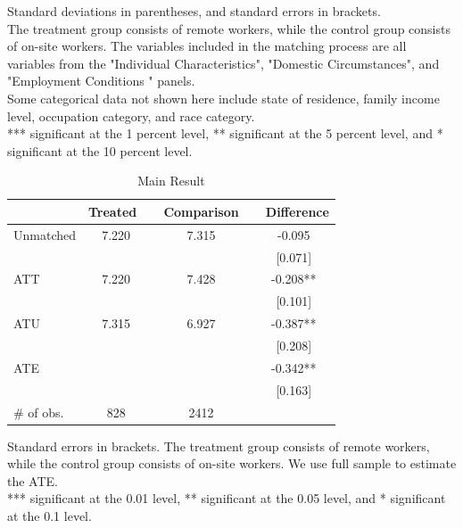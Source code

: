 \documentclass[12pt]{article}
\renewcommand{\arraystretch}{1.0} %
\begin{document}
\vspace{-2em}
\begin{singlespace}
        \begin{footnotesize}
        		 Standard deviations in parentheses, and standard errors in brackets.\\
          The treatment group consists of remote workers, while the control group consists of on-site workers. The variables included in the matching process are all variables from the "Individual Characteristics", "Domestic Circumstances", and "Employment Conditions " panels.\\
          Some categorical data not shown here include state of residence, family income level, occupation category, and race category. \\
		*** significant at the 1 percent level, ** significant at the 5 percent level, and * significant at the 10 percent level.
        \end{footnotesize}
\end{singlespace}


\newpage


\begin{table}[htbp]
\renewcommand{\arraystretch}{0.85}
\setlength{\tabcolsep}{2mm}
  \centering
  \caption{Main Result}
  \label{main_table}
{\small
    \begin{tabular}{lccc}
    \toprule
    & Treated~ & ~Comparison~ & ~Difference \\ 
    \midrule \midrule
    Unmatched & 7.220 & 7.315 & -0.095 \\ 
    &  & & [0.071]\\ 
    \midrule 
    ATT & 7.220 & 7.428 & -0.208** \\ 
    &  & & [0.101]\\ 
    \midrule
    ATU & 7.315 & 6.927 & -0.387** \\ 
    & & & [0.208]\\ 
    \midrule
    ATE & & & -0.342** \\ 
    & & &[0.163] \\ 
    \midrule
    \# of obs. & 828 & 2412 & \\ 
    \bottomrule
    \end{tabular}
}
\end{table}

\vspace{-2em}
\begin{singlespace}
        \begin{footnotesize}
        		 Standard errors in brackets.
          The treatment group consists of remote workers, while the control group consists of on-site workers. 
          We use full sample to estimate the ATE.\\
		*** significant at the 0.01 level, ** significant at the 0.05 level, and * significant at the 0.1 level.
        \end{footnotesize}
\end{singlespace}
\end{document}

